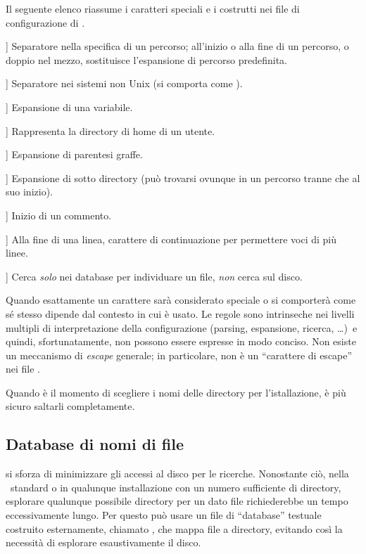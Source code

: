 \documentclass{article}
\begin{document}
Il seguente elenco riassume i caratteri speciali e i costrutti nei file di
configurazione di \KPS{}.

\newcommand{\CODE}[1]{\makebox[3em][l]{\code{#1}}}
\begin{ttdescription}
\item[\CODE{:}] Separatore nella specifica di un percorso; all'inizio o
  alla fine di un percorso, o doppio nel mezzo, sostituisce l'espansione
  di percorso predefinita.\par
\item[\CODE{;}] Separatore nei sistemi non Unix (si comporta come
  \code{:}).
\item[\CODE{\$}] Espansione di una variabile.
\item[\CODE{\string~}] Rappresenta la directory di home di un utente.
\item[\CODE{\char`\{...\char`\}}] Espansione di parentesi graffe.
\item[\CODE{//}] Espansione di sotto directory (può trovarsi ovunque in un
  percorso tranne che al suo inizio).
\item[\CODE{\%}] Inizio di un commento.
\item[\CODE{\bs}] Alla fine di una linea, carattere di continuazione per
  permettere voci di più linee.
\item[\CODE{!!}] Cerca \emph{solo} nei database per individuare un file,
    \emph{non} cerca sul disco.
\end{ttdescription}

Quando esattamente un carattere sarà considerato speciale o si comporterà
come sé stesso dipende dal contesto in cui è usato. Le regole sono
intrinseche nei livelli multipli di interpretazione della configurazione
(parsing, espansione, ricerca, \ldots)\ e quindi, sfortunatamente, non
possono essere espresse in modo conciso. Non esiste un meccanismo di
\emph{escape} generale; in particolare, \samp{\bs} non è un ``carattere di
escape'' nei file .

Quando è il momento di scegliere i nomi delle directory per
l'istallazione, è più sicuro saltarli completamente.

\subsection{Database di nomi di file}
\label{sec:filename-database}

\KPS{} si sforza di minimizzare gli accessi al disco per le ricerche.
Nonostante ciò, nella \TL\ standard o in qualunque installazione con un
numero sufficiente di directory, esplorare qualunque possibile directory
per un dato file richiederebbe un tempo eccessivamente lungo. Per questo
\KPS{} può usare un file di ``database'' testuale costruito esternamente,
chiamato , che mappa file a directory, evitando così la
necessità di esplorare esaustivamente il disco.
\end{document}

